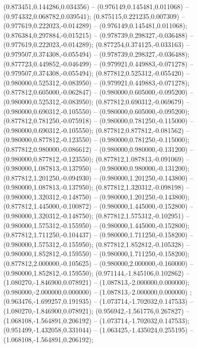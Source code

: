  (0.873451,0.144286,0.034356) -- (0.976149,0.145481,0.011068) -- (0.974332,0.068782,0.039541);
 (0.875115,0.221235,0.007309) -- (0.977619,0.222023,-0.014289) -- (0.976149,0.145481,0.011068);
 (0.876384,0.297884,-0.015215) -- (0.978739,0.298327,-0.036488) -- (0.977619,0.222023,-0.014289);
 (0.877254,0.374125,-0.033163) -- (0.979507,0.374308,-0.055494) -- (0.978739,0.298327,-0.036488);
 (0.877723,0.449852,-0.046499) -- (0.979921,0.449883,-0.071278) -- (0.979507,0.374308,-0.055494);
 (0.877812,0.525312,-0.055420) -- (0.980000,0.525312,-0.083950) -- (0.979921,0.449883,-0.071278);
 (0.877812,0.605000,-0.062847) -- (0.980000,0.605000,-0.095200) -- (0.980000,0.525312,-0.083950);
 (0.877812,0.690312,-0.069679) -- (0.980000,0.690312,-0.105550) -- (0.980000,0.605000,-0.095200);
 (0.877812,0.781250,-0.075918) -- (0.980000,0.781250,-0.115000) -- (0.980000,0.690312,-0.105550);
 (0.877812,0.877812,-0.081562) -- (0.980000,0.877812,-0.123550) -- (0.980000,0.781250,-0.115000);
 (0.877812,0.980000,-0.086612) -- (0.980000,0.980000,-0.131200) -- (0.980000,0.877812,-0.123550);
 (0.877812,1.087813,-0.091069) -- (0.980000,1.087813,-0.137950) -- (0.980000,0.980000,-0.131200);
 (0.877812,1.201250,-0.094930) -- (0.980000,1.201250,-0.143800) -- (0.980000,1.087813,-0.137950);
 (0.877812,1.320312,-0.098198) -- (0.980000,1.320312,-0.148750) -- (0.980000,1.201250,-0.143800);
 (0.877812,1.445000,-0.100872) -- (0.980000,1.445000,-0.152800) -- (0.980000,1.320312,-0.148750);
 (0.877812,1.575312,-0.102951) -- (0.980000,1.575312,-0.155950) -- (0.980000,1.445000,-0.152800);
 (0.877812,1.711250,-0.104437) -- (0.980000,1.711250,-0.158200) -- (0.980000,1.575312,-0.155950);
 (0.877812,1.852812,-0.105328) -- (0.980000,1.852812,-0.159550) -- (0.980000,1.711250,-0.158200);
 (0.877812,2.000000,-0.105625) -- (0.980000,2.000000,-0.160000) -- (0.980000,1.852812,-0.159550);
 (0.971144,-1.845106,0.102862) -- (1.080270,-1.846900,0.078921) -- (1.087813,-2.000000,0.000000);
 (0.980000,-2.000000,0.000000) -- (1.087813,-2.000000,0.000000) ;
 (0.963476,-1.699257,0.191935) -- (1.073714,-1.702032,0.147533) -- (1.080270,-1.846900,0.078921);
 (0.956942,-1.561776,0.267827) -- (1.068108,-1.564891,0.206192) -- (1.073714,-1.702032,0.147533);
 (0.951499,-1.432058,0.331044) -- (1.063425,-1.435024,0.255195) -- (1.068108,-1.564891,0.206192);

